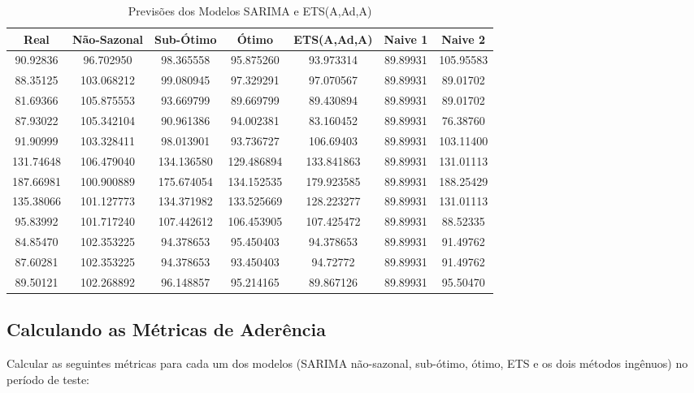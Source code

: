 \documentclass[a4paper, 12pt]{article}
\begin{document}
\begin{table}[H]
\centering
\small
\caption{Previsões dos Modelos SARIMA e ETS(A,Ad,A)}
\begin{tabular}{|c|c|c|c|c|c|c|}
\hline
\textbf{Real} & \textbf{Não-Sazonal} & \textbf{Sub-Ótimo} & \textbf{Ótimo} & \textbf{ETS(A,Ad,A)} & \textbf{Naive 1} & \textbf{Naive 2} \\ \hline
 90.92836  & 96.702950  & 98.365558  & 95.875260  & 93.973314  & 89.89931  & 105.95583 \\ \hline
 88.35125  & 103.068212 & 99.080945  & 97.329291  & 97.070567  & 89.89931  & 89.01702  \\ \hline
 81.69366  & 105.875553 & 93.669799  & 89.669799  & 89.430894  & 89.89931  & 89.01702  \\ \hline
87.93022  & 105.342104 & 90.961386  & 94.002381  & 83.160452  & 89.89931  & 76.38760  \\ \hline
 91.90999  & 103.328411 & 98.013901  & 93.736727  & 106.69403  & 89.89931  & 103.11400 \\ \hline
131.74648 & 106.479040 & 134.136580 & 129.486894 & 133.841863 & 89.89931  & 131.01113 \\ \hline
187.66981 & 100.900889 & 175.674054 & 134.152535 & 179.923585 & 89.89931  & 188.25429 \\ \hline
135.38066 & 101.127773 & 134.371982 & 133.525669 & 128.223277 & 89.89931  & 131.01113 \\ \hline
95.83992  & 101.717240 & 107.442612 & 106.453905 & 107.425472 & 89.89931  & 88.52335  \\ \hline
84.85470  & 102.353225 & 94.378653  & 95.450403  & 94.378653  & 89.89931  & 91.49762  \\ \hline
87.60281  & 102.353225 & 94.378653  & 93.450403  & 94.72772   & 89.89931  & 91.49762  \\ \hline
89.50121  & 102.268892 & 96.148857  & 95.214165  & 89.867126  & 89.89931  & 95.50470  \\ \hline
\end{tabular}
\end{table}




\subsection{Calculando as Métricas de Aderência}
Calcular as seguintes métricas para cada um dos modelos (SARIMA não-sazonal, sub-ótimo, ótimo, ETS e os dois métodos ingênuos) no período de teste:
\end{document}
